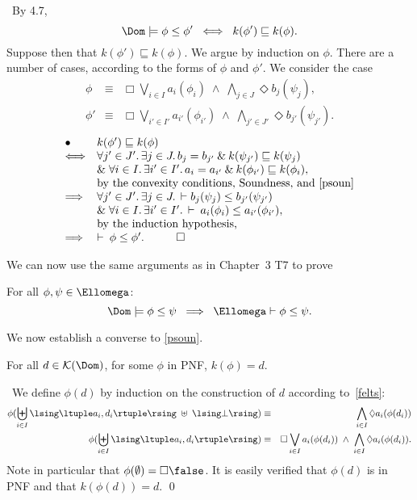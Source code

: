 \proof\ By 4.7,
\[ \Dom  \models  \phi \leq \phi' \;\; \Longleftrightarrow \;\; k(\phi' ) \sqsubseteq k(\phi ) . \]
Suppose then that $k(\phi' ) \sqsubseteq k(\phi )$.
We argue by induction on $\phi$.
There are a number of cases, according to the forms of $\phi$ and $\phi'$.
We consider the case
\begin{eqnarray*}
\phi & \equiv & \Box \bigvee_{i \in I} a_{i}(\phi_{i}) \; \wedge \; \bigwedge_{j \in J} \Diamond b_{j}(\psi_{j}) , \\
\phi' & \equiv & \Box \bigvee_{i' \in I'} a_{i'}(\phi_{i'}) \; \wedge \; \bigwedge_{j' \in J'} \Diamond b_{j'}(\psi_{j'}) .
\end{eqnarray*}
\[ \begin{array}{ll}
\bullet & k(\phi' ) \sqsubseteq k(\phi ) \\
\Longleftrightarrow & \forall j' \in J' . \, \exists j \in J . \, b_{j} = b_{j'} \: \& \: k(\psi_{j'}) \sqsubseteq k(\psi_{j}) \\
& \mbox{}\& \; \forall i \in I . \, \exists i' \in I' . \, a_{i} = a_{i'} \: \& \: k(\phi_{i'}) \sqsubseteq k(\phi_{i}), \\
& \mbox{by the convexity conditions, Soundness, and \ref{psoun}} \\
\Longrightarrow & \forall j' \in J' . \, \exists j \in J . \, \vdash  b_{j}(\psi_{j}) \leq b_{j'}(\psi_{j'}) \\
& \mbox{} \& \; \forall i \in I . \, \exists i' \in I' . \, \vdash \: a_{i}(\phi_{i}) \leq a_{i'}(\phi_{i'}), \\
& \mbox{by the induction hypothesis,} \\
\Longrightarrow & \vdash \: \phi \leq \phi' . \;\;\; \qed
\end{array} \]

We can now use the same arguments as in Chapter~3 T7 to prove

\begin{theorem}[Completeness]
For all $\phi , \psi \in \Ellomega$:
\[ \Dom  \models  \phi \leq \psi \;\; \Longrightarrow \;\; \Ellomega  \vdash  \phi \leq \psi . \]
\end{theorem}

We now establish a converse to \ref{psoun}.
\begin{theorem}[Definability]
For all $d \in {\cal K}(\Dom )$, for some $\phi$ in PNF, $k(\phi ) = d$.
\end{theorem}

\proof\ We define $\phi (d)$ by induction on the construction of $d$ according to~\ref{felts}:
\begin{eqnarray*}
\phi (\biguplus_{i \in I} \lsing \ltuple a_{i}, d_{i} \rtuple \rsing \; \uplus \; \lsing \bot \rsing ) & \equiv & \bigwedge_{i \in I} \Diamond a_{i}(\phi (d_{i} )) \\
\phi ( \biguplus_{i \in I} \lsing \ltuple a_{i}, d_{i} \rtuple \rsing ) & \equiv & \Box \bigvee_{i \in I} a_{i} (\phi (d_{i} )) \; \wedge \; \bigwedge_{i \in I} \Diamond a_{i}(\phi (d_{i})).
\end{eqnarray*} 
Note in particular that $\phi (\emptyset ) = \Box \false$.
It is easily verified that $\phi (d)$ is in PNF and that $k(\phi (d)) = d$. \qed


